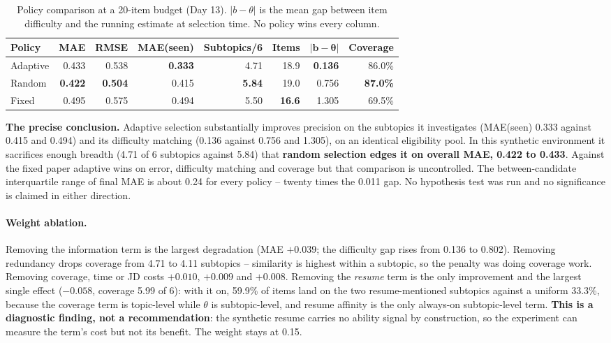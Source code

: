 \documentclass{tietreport}
\begin{document}
\begin{table}[htbp]
\centering\small
\begin{tabular}{lrrrrrrr}
  \toprule
  \textbf{Policy} & \textbf{MAE} & \textbf{RMSE} & \textbf{MAE(seen)} & \textbf{Subtopics/6} & \textbf{Items} & $\mathbf{|b-\theta|}$ & \textbf{Coverage} \\
  \midrule
  Adaptive & 0.433 & 0.538 & \textbf{0.333} & 4.71 & 18.9 & \textbf{0.136} & 86.0\% \\
  Random & \textbf{0.422} & \textbf{0.504} & 0.415 & \textbf{5.84} & 19.0 & 0.756 & \textbf{87.0\%} \\
  Fixed & 0.495 & 0.575 & 0.494 & 5.50 & \textbf{16.6} & 1.305 & 69.5\% \\
  \bottomrule
\end{tabular}
\caption{Policy comparison at a 20-item budget (Day 13). $|b-\theta|$ is the mean gap between item difficulty and the running estimate at selection time. No policy wins every column.}
\label{tab:policies}
\end{table}

\textbf{The precise conclusion.} Adaptive selection substantially improves precision on the
subtopics it investigates (MAE(seen) 0.333 against 0.415 and 0.494) and its difficulty matching
(0.136 against 0.756 and 1.305), on an identical eligibility pool. In this synthetic environment
it sacrifices enough breadth (4.71 of 6 subtopics against 5.84) that \textbf{random selection
edges it on overall MAE, 0.422 to 0.433}. Against the fixed paper adaptive wins on error,
difficulty matching and coverage but that comparison is uncontrolled. The between-candidate
interquartile range of final MAE is about 0.24 for every policy -- twenty times the 0.011 gap.
No hypothesis test was run and no significance is claimed in either direction.

\paragraph{Weight ablation.} Removing the information term is the largest degradation
(MAE $+0.039$; the difficulty gap rises from 0.136 to 0.802). Removing redundancy drops coverage
from 4.71 to 4.11 subtopics -- similarity is highest within a subtopic, so the penalty was doing
coverage work. Removing coverage, time or JD costs $+0.010$, $+0.009$ and $+0.008$. Removing the
\emph{resume} term is the only improvement and the largest single effect ($-0.058$, coverage
5.99 of 6): with it on, 59.9\% of items land on the two resume-mentioned subtopics against a
uniform 33.3\%, because the coverage term is topic-level while $\theta$ is subtopic-level, and
resume affinity is the only always-on subtopic-level term. \textbf{This is a diagnostic
finding, not a recommendation}: the synthetic resume carries no ability signal by construction,
so the experiment can measure the term's cost but not its benefit. The weight stays at 0.15.
\end{document}
